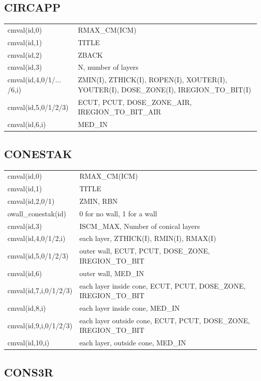 \documentclass[12pt]{book}
\begin{document}
\subsection{CIRCAPP}

\begin{tabular}{|p{4.5cm}|p{11.5cm}|}\hline
cmval(id,0) &  RMAX\_CM(ICM)\\
cmval(id,1) &  TITLE \\
cmval(id,2) &  ZBACK\\
cmval(id,3) &  N, number of layers\\
cmval(id,4,0/1/$\ldots$/6,i) & ZMIN(I), ZTHICK(I), ROPEN(I), XOUTER(I),
YOUTER(I), DOSE\_ZONE(I), IREGION\_TO\_BIT(I)\\
cmval(id,5,0/1/2/3) & ECUT, PCUT, DOSE\_ZONE\_AIR, IREGION\_TO\_BIT\_AIR\\
cmval(id,6,i) & MED\_IN \\ \hline
\end{tabular}

\subsection{CONESTAK}

\begin{tabular}{|p{4.5cm}|p{11.5cm}|}\hline
cmval(id,0) &  RMAX\_CM(ICM) \\
cmval(id,1) & TITLE \\
cmval(id,2,0/1) &  ZMIN, RBN \\
owall\_conestak(id) & 0 for no wall, 1 for a wall \\
cmval(id,3) &  ISCM\_MAX, Number of conical layers \\
cmval(id,4,0/1/2,i) & each layer, ZTHICK(I), RMIN(I), RMAX(I)\\
cmval(id,5,0/1/2/3) & outer wall, ECUT, PCUT, DOSE\_ZONE, IREGION\_TO\_BIT \\
cmval(id,6) & outer wall,  MED\_IN \\
cmval(id,7,i,0/1/2/3) & each layer inside cone, ECUT, PCUT, DOSE\_ZONE, IREGION\_TO\_BIT \\
cmval(id,8,i) & each layer inside cone, MED\_IN \\
cmval(id,9,i,0/1/2/3) & each layer outside cone, ECUT, PCUT, DOSE\_ZONE, IREGION\_TO\_BIT \\
cmval(id,10,i) & each layer, outside cone, MED\_IN \\\hline
\end{tabular}

\subsection{CONS3R}
\end{document}
